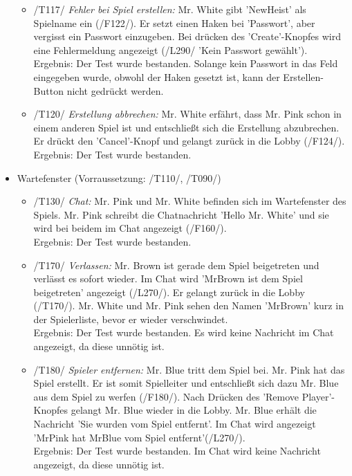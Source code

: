 \documentclass[a4paper]{article}
\begin{document}
\begin{itemize}
\begin{itemize}
		\item /T117/ \textit{Fehler bei Spiel erstellen:} Mr. White gibt 'NewHeist' als Spielname ein (/F122/). Er setzt einen 			Haken bei 'Passwort', aber vergisst ein Passwort einzugeben. Bei drücken des 'Create'-Knopfes wird eine 					Fehlermeldung angezeigt (/L290/ 'Kein Passwort gewählt'). \\
		Ergebnis: Der Test wurde bestanden. Solange kein Passwort in das Feld eingegeben wurde, obwohl der Haken 				gesetzt ist, kann der Erstellen-Button nicht gedrückt werden.
		
		\item /T120/ \textit{Erstellung abbrechen:} Mr. White erfährt, dass Mr. Pink schon in einem anderen Spiel ist und 				entschließt sich die Erstellung abzubrechen. Er drückt den 'Cancel'-Knopf und gelangt zurück in die Lobby		(/F124/). \\
		Ergebnis: Der Test wurde bestanden.
		
	\end{itemize}
	\item Wartefenster (Vorraussetzung: /T110/, /T090/)
	
	\begin{itemize}
		
		\item /T130/ \textit{Chat:} Mr. Pink und Mr. White befinden sich im Wartefenster des Spiels. Mr. Pink schreibt 			die Chatnachricht 'Hello Mr. White' und sie wird bei beidem im Chat angezeigt (/F160/). \\
		Ergebnis: Der Test wurde bestanden.
		
		\item /T170/ \textit{Verlassen:} Mr. Brown ist gerade dem Spiel beigetreten und verlässt es sofort wieder. Im Chat 			wird 'MrBrown ist dem Spiel beigetreten' angezeigt (/L270/). Er gelangt zurück in die Lobby (/T170/). Mr. White 			und Mr. Pink sehen den Namen 'MrBrown' kurz in der Spielerliste, bevor er wieder verschwindet. \\
		Ergebnis: Der Test wurde bestanden. Es wird keine Nachricht im Chat angezeigt, da diese unnötig ist.
		
		\item /T180/ \textit{Spieler entfernen:} Mr. Blue tritt dem Spiel bei. Mr. Pink hat das Spiel erstellt. Er ist somit 				Spielleiter und entschließt sich dazu Mr. Blue aus dem Spiel zu werfen (/F180/). Nach Drücken des 'Remove 				Player'-Knopfes gelangt Mr. Blue wieder in die Lobby. Mr. Blue erhält die Nachricht 'Sie wurden vom Spiel 				entfernt'. Im Chat wird angezeigt 'MrPink hat MrBlue vom Spiel entfernt'(/L270/). \\
		Ergebnis: Der Test wurde bestanden. Im Chat wird keine Nachricht angezeigt, da diese unnötig ist.
		

\end{itemize}
\end{itemize}
\end{document}
